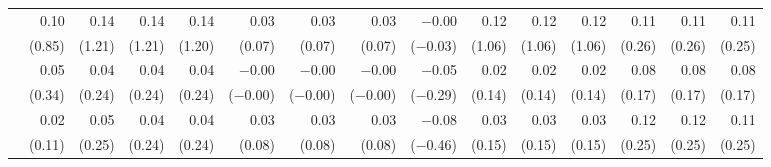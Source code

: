 \begin{tabularx}{1.45\textwidth}{lRRRRRRRRRRRRRR}
		 & \num{0.10}\phantom{***)} & \num{0.14}\phantom{***)} & \num{0.14}\phantom{***)} & \num{0.14}\phantom{***)} & \num{0.03}\phantom{***)} & \num{0.03}\phantom{***)} & \num{0.03}\phantom{***)} & \num{-0.00}\phantom{***)} & \num{0.12}\phantom{***)} & \num{0.12}\phantom{***)} & \num{0.12}\phantom{***)} & \num{0.11}\phantom{***)} & \num{0.11}\phantom{***)} & \num{0.11}\phantom{***)} \\
		 & (\num{0.85})\phantom{***} & (\num{1.21})\phantom{***} & (\num{1.21})\phantom{***} & (\num{1.20})\phantom{***} & (\num{0.07})\phantom{***} & (\num{0.07})\phantom{***} & (\num{0.07})\phantom{***} & (\num{-0.03})\phantom{***} & (\num{1.06})\phantom{***} & (\num{1.06})\phantom{***} & (\num{1.06})\phantom{***} & (\num{0.26})\phantom{***} & (\num{0.26})\phantom{***} & (\num{0.25})\phantom{***} \\ [\dspacing]
		 & \num{0.05}\phantom{***)} & \num{0.04}\phantom{***)} & \num{0.04}\phantom{***)} & \num{0.04}\phantom{***)} & \num{-0.00}\phantom{***)} & \num{-0.00}\phantom{***)} & \num{-0.00}\phantom{***)} & \num{-0.05}\phantom{***)} & \num{0.02}\phantom{***)} & \num{0.02}\phantom{***)} & \num{0.02}\phantom{***)} & \num{0.08}\phantom{***)} & \num{0.08}\phantom{***)} & \num{0.08}\phantom{***)} \\
		 & (\num{0.34})\phantom{***} & (\num{0.24})\phantom{***} & (\num{0.24})\phantom{***} & (\num{0.24})\phantom{***} & (\num{-0.00})\phantom{***} & (\num{-0.00})\phantom{***} & (\num{-0.00})\phantom{***} & (\num{-0.29})\phantom{***} & (\num{0.14})\phantom{***} & (\num{0.14})\phantom{***} & (\num{0.14})\phantom{***} & (\num{0.17})\phantom{***} & (\num{0.17})\phantom{***} & (\num{0.17})\phantom{***} \\ [\dspacing]
		 & \num{0.02}\phantom{***)} & \num{0.05}\phantom{***)} & \num{0.04}\phantom{***)} & \num{0.04}\phantom{***)} & \num{0.03}\phantom{***)} & \num{0.03}\phantom{***)} & \num{0.03}\phantom{***)} & \num{-0.08}\phantom{***)} & \num{0.03}\phantom{***)} & \num{0.03}\phantom{***)} & \num{0.03}\phantom{***)} & \num{0.12}\phantom{***)} & \num{0.12}\phantom{***)} & \num{0.11}\phantom{***)} \\
		 & (\num{0.11})\phantom{***} & (\num{0.25})\phantom{***} & (\num{0.24})\phantom{***} & (\num{0.24})\phantom{***} & (\num{0.08})\phantom{***} & (\num{0.08})\phantom{***} & (\num{0.08})\phantom{***} & (\num{-0.46})\phantom{***} & (\num{0.15})\phantom{***} & (\num{0.15})\phantom{***} & (\num{0.15})\phantom{***} & (\num{0.25})\phantom{***} & (\num{0.25})\phantom{***} & (\num{0.25})\phantom{***} \\ [\dspacing]

\end{tabularx}
